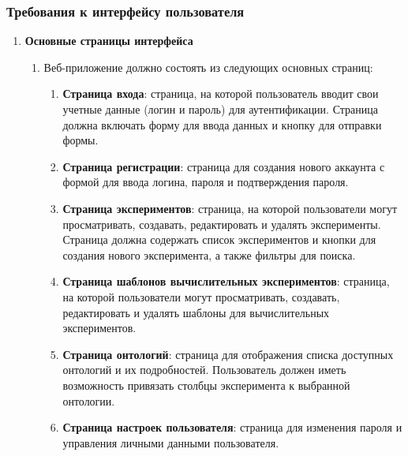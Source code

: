 \documentclass[a4paper,12pt,reqno]{article}
\begin{document}
    \subsubsection{Требования к интерфейсу пользователя}\label{ui-requirements}

    \begin{enumerate}
        \item \textbf{Основные страницы интерфейса}
        \begin{enumerate}[label=\arabic{enumi}.\arabic*.]
            \item Веб-приложение должно состоять из следующих основных страниц:
            \begin{enumerate}[label=\arabic{enumi}.\arabic{enumii}.\arabic*.]
                \item \textbf{Страница входа}: страница, на которой пользователь вводит свои учетные данные (логин и пароль) для аутентификации. Страница должна включать форму для ввода данных и кнопку для отправки формы.
                \item \textbf{Страница регистрации}: страница для создания нового аккаунта с формой для ввода логина, пароля и подтверждения пароля.
                \item \textbf{Страница экспериментов}: страница, на которой пользователи могут просматривать, создавать, редактировать и удалять эксперименты. Страница должна содержать список экспериментов и кнопки для создания нового эксперимента, а также фильтры для поиска.
                \item \textbf{Страница шаблонов вычислительных экспериментов}: страница, на которой пользователи могут просматривать, создавать, редактировать и удалять шаблоны для вычислительных экспериментов.
                \item \textbf{Страница онтологий}: страница для отображения списка доступных онтологий и их подробностей. Пользователь должен иметь возможность привязать столбцы эксперимента к выбранной онтологии.
                \item \textbf{Страница настроек пользователя}: страница для изменения пароля и управления личными данными пользователя.
            \end{enumerate}
        \end{enumerate}


\end{enumerate}
\end{document}
